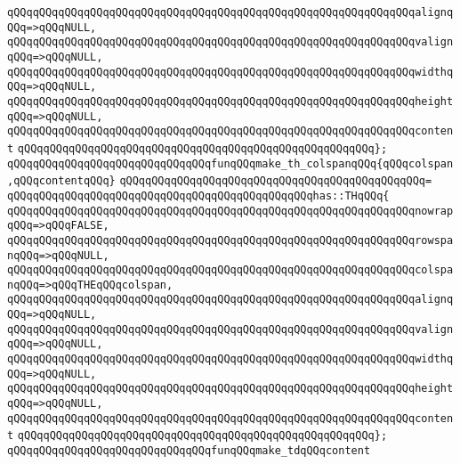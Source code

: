 \verb|qQQqqQQqqQQqqQQqqQQqqQQqqQQqqQQqqQQqqQQqqQQqqQQqqQQqqQQqqQQqqQQqalignqQQq=>qQQqNULL,|\newline
\verb|qQQqqQQqqQQqqQQqqQQqqQQqqQQqqQQqqQQqqQQqqQQqqQQqqQQqqQQqqQQqqQQqvalignqQQq=>qQQqNULL,|\newline
\verb|qQQqqQQqqQQqqQQqqQQqqQQqqQQqqQQqqQQqqQQqqQQqqQQqqQQqqQQqqQQqqQQqwidthqQQq=>qQQqNULL,|\newline
\verb|qQQqqQQqqQQqqQQqqQQqqQQqqQQqqQQqqQQqqQQqqQQqqQQqqQQqqQQqqQQqqQQqheightqQQq=>qQQqNULL,|\newline
\verb|qQQqqQQqqQQqqQQqqQQqqQQqqQQqqQQqqQQqqQQqqQQqqQQqqQQqqQQqqQQqqQQqcontent|\newline
\verb|qQQqqQQqqQQqqQQqqQQqqQQqqQQqqQQqqQQqqQQqqQQqqQQqqQQqqQQq};|\newline
\newline
\verb|qQQqqQQqqQQqqQQqqQQqqQQqqQQqqQQqfunqQQqmake_th_colspanqQQq{qQQqcolspan,qQQqcontentqQQq}|\newline
\verb|qQQqqQQqqQQqqQQqqQQqqQQqqQQqqQQqqQQqqQQqqQQqqQQq=|\newline
\verb|qQQqqQQqqQQqqQQqqQQqqQQqqQQqqQQqqQQqqQQqqQQqqQQqhas::THqQQq{|\newline
\verb|qQQqqQQqqQQqqQQqqQQqqQQqqQQqqQQqqQQqqQQqqQQqqQQqqQQqqQQqqQQqqQQqnowrapqQQq=>qQQqFALSE,|\newline
\verb|qQQqqQQqqQQqqQQqqQQqqQQqqQQqqQQqqQQqqQQqqQQqqQQqqQQqqQQqqQQqqQQqrowspanqQQq=>qQQqNULL,|\newline
\verb|qQQqqQQqqQQqqQQqqQQqqQQqqQQqqQQqqQQqqQQqqQQqqQQqqQQqqQQqqQQqqQQqcolspanqQQq=>qQQqTHEqQQqcolspan,|\newline
\verb|qQQqqQQqqQQqqQQqqQQqqQQqqQQqqQQqqQQqqQQqqQQqqQQqqQQqqQQqqQQqqQQqalignqQQq=>qQQqNULL,|\newline
\verb|qQQqqQQqqQQqqQQqqQQqqQQqqQQqqQQqqQQqqQQqqQQqqQQqqQQqqQQqqQQqqQQqvalignqQQq=>qQQqNULL,|\newline
\verb|qQQqqQQqqQQqqQQqqQQqqQQqqQQqqQQqqQQqqQQqqQQqqQQqqQQqqQQqqQQqqQQqwidthqQQq=>qQQqNULL,|\newline
\verb|qQQqqQQqqQQqqQQqqQQqqQQqqQQqqQQqqQQqqQQqqQQqqQQqqQQqqQQqqQQqqQQqheightqQQq=>qQQqNULL,|\newline
\verb|qQQqqQQqqQQqqQQqqQQqqQQqqQQqqQQqqQQqqQQqqQQqqQQqqQQqqQQqqQQqqQQqcontent|\newline
\verb|qQQqqQQqqQQqqQQqqQQqqQQqqQQqqQQqqQQqqQQqqQQqqQQqqQQqqQQq};|\newline
\newline
\verb|qQQqqQQqqQQqqQQqqQQqqQQqqQQqqQQqfunqQQqmake_tdqQQqcontent|\newline
